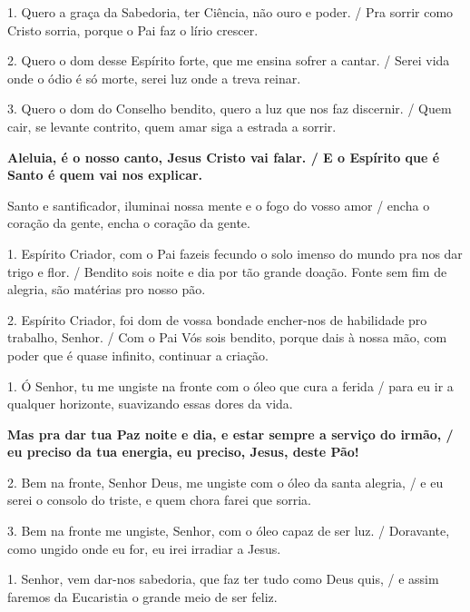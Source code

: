 \documentclass[a5paper,9pt]{extarticle}
\begin{document}
\begin{cantos}
\begin{canto}
1. Quero a graça da Sabedoria, ter Ciência, não ouro e poder. / Pra sorrir como Cristo sorria, porque o Pai faz o lírio crescer.

2. Quero o dom desse Espírito forte, que me ensina sofrer a cantar. / Serei vida onde o ódio é só morte, serei luz onde a treva reinar.

3. Quero o dom do Conselho bendito, quero a luz que nos faz discernir. / Quem cair, se levante contrito, quem amar siga a estrada a sorrir.
\end{canto}

\begin{canto}
\textbf{Aleluia, é o nosso canto, Jesus Cristo vai falar. / E o Espírito que é Santo é quem vai nos explicar.}

Santo e santificador, iluminai nossa mente e o fogo do vosso amor / encha o coração da gente, encha o coração da gente.
\end{canto}

\begin{canto}
1. Espírito Criador, com o Pai fazeis fecundo o solo imenso do mundo pra nos dar trigo e flor. / Bendito sois noite e dia por tão grande doação. Fonte sem fim de alegria, são matérias pro nosso pão.

2. Espírito Criador, foi dom de vossa bondade encher-nos de habilidade pro trabalho, Senhor. / Com o Pai Vós sois bendito, porque dais à nossa mão, com poder que é quase infinito, continuar a criação.
\end{canto}

\begin{canto}
1. Ó Senhor, tu me ungiste na fronte com o óleo que cura a ferida / para eu ir a qualquer horizonte, suavizando essas dores da vida.

\textbf{Mas pra dar tua Paz noite e dia, e estar sempre a serviço do irmão, / eu preciso da tua energia, eu preciso, Jesus, deste Pão!}

2. Bem na fronte, Senhor Deus, me ungiste com o óleo da santa alegria, / e eu serei o consolo do triste, e quem chora farei que sorria.

3. Bem na fronte me ungiste, Senhor, com o óleo capaz de ser luz. / Doravante, como ungido onde eu for, eu irei irradiar a Jesus.
\end{canto}

\begin{canto}
1. Senhor, vem dar-nos sabedoria, que faz ter tudo como Deus quis, / e assim faremos da Eucaristia o grande meio de ser feliz.


\end{canto}
\end{cantos}
\end{document}
